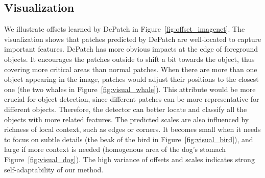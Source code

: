 \documentclass[sigconf,screen]{acmart}
\begin{document}
\subsection{Visualization}
\begin{figure*}[h]
  \caption{Visualization of learned patches and their offsets with our DPT-Small at stage 4. Our method can adaptively adjust the position and scale for each patch based on the input content.}
  \label{fig:offset_imagenet}
\end{figure*}
We illustrate offsets learned by DePatch in Figure~\ref{fig:offset_imagenet}. The visualization shows that patches predicted by DePatch are well-located to capture important features. DePatch has more obvious impacts at the edge of foreground objects. It encourages the patches outside to shift a bit towards the object, thus covering more critical areas than normal patches. When there are more than one object appearing in the image, patches would adjust their positions to the closest one (the two whales in Figure~\ref{fig:visual_whale}). This attribute would be more crucial for object detection, since different patches can be more representative for different objects. Therefore, the detector can better locate and classify all the objects with more related features. The predicted scales are also influenced by richness of local context, such as edges or corners. It becomes small when it needs to focus on subtle details (the beak of the bird in Figure~\ref{fig:visual_bird}), and large if more context is needed (homogenous area of the dog's stomach Figure~\ref{fig:visual_dog}). The high variance of offsets and scales indicates strong self-adaptability of our method.
\end{document}

